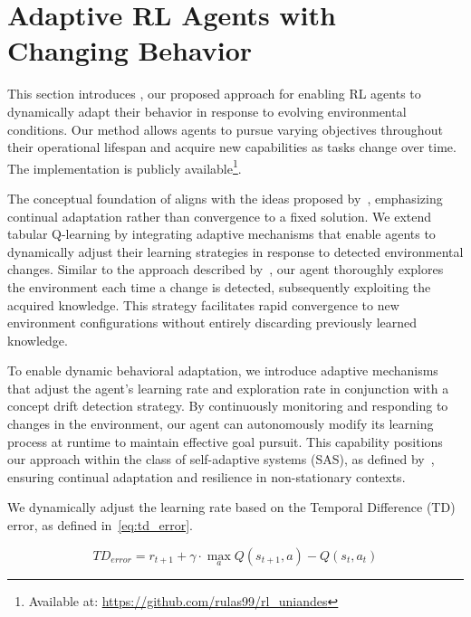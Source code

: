 
\section{Adaptive \ac{RL} Agents with Changing Behavior}
\label{sec:implementation}

This section introduces \adaptiverl, our proposed approach for enabling \ac{RL} agents to dynamically adapt their behavior in response to evolving environmental conditions. Our method allows agents to pursue varying objectives throughout their operational lifespan and acquire new capabilities as tasks change over time. The implementation is publicly available\footnote{Available at: \url{https://github.com/rulas99/rl_uniandes}}.

The conceptual foundation of \adaptiverl aligns with the ideas proposed by~\citet{abel2023definitioncontinualreinforcementlearning}, emphasizing continual adaptation rather than convergence to a fixed solution. We extend tabular Q-learning by integrating adaptive mechanisms that enable agents to dynamically adjust their learning strategies in response to detected environmental changes. Similar to the approach described by~\citet{norman2024firstexploreexploitmetalearningsolve}, our agent thoroughly explores the environment each time a change is detected, subsequently exploiting the acquired knowledge. This strategy facilitates rapid convergence to new environment configurations without entirely discarding previously learned knowledge.

To enable dynamic behavioral adaptation, we introduce adaptive mechanisms that adjust the agent’s learning rate and exploration rate in conjunction with a concept drift detection strategy. By continuously monitoring and responding to changes in the environment, our agent can autonomously modify its learning process at runtime to maintain effective goal pursuit. This capability positions our approach within the class of self-adaptive systems (SAS), as defined by~\citet{sasreview}, ensuring continual adaptation and resilience in non-stationary contexts.

We dynamically adjust the learning rate based on the Temporal Difference (TD) error, as defined in~\eqref{eq:td_error}.

\begin{equation}
    \label{eq:td_error}
    TD_{error} = r_{t+1} + \gamma \cdot \underset{a}{\max} Q(s_{t+1}, a) - Q(s_t, a_t)
\end{equation}

